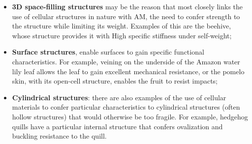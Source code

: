 \begin{itemize}
    \item \textbf{3D space-filling structures} may be the reason that most closely links the use of cellular structures in nature with AM, the need to confer strength to the structure while limiting its weight. Examples of this are the beehive, whose structure provides it with High specific stiffness under self-weight;
    \item \textbf{Surface structures}, enable surfaces to gain specific functional characteristics. For example, veining on the underside of the Amazon water lily leaf allows the leaf to gain excellent mechanical resistance, or the pomelo skin, with its open-cell structure, enables the fruit to resist impacts;
    \item \textbf{Cylindrical structures}: there are also examples of the use of cellular materials to confer particular characteristics to cylindrical structures (often hollow structures) that would otherwise be too fragile. For example, hedgehog quills have a particular internal structure that confers ovalization and buckling resistance to the quill.
\end{itemize}

